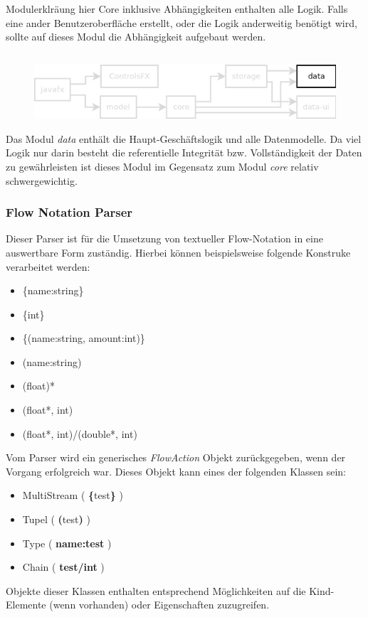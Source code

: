 Modulerklräung hier
Core inklusive Abhängigkeiten enthalten alle Logik. Falls eine ander Benutzeroberfläche erstellt,
oder die Logik anderweitig benötigt wird, sollte auf dieses Modul die Abhängigkeit aufgebaut werden.




\subsection{\textModData}
\label{\textModData}
\begin{figure}[h!]
	\centering
	\includegraphics[width=.8\textwidth]{module_dependencies_data.png}
\end{figure}

Das Modul \textit{data} enthält die Haupt-Geschäftslogik und alle Datenmodelle. Da viel Logik nur darin besteht
die referentielle Integrität bzw. Vollständigkeit der Daten zu gewährleisten ist dieses Modul im Gegensatz zum
Modul \textit{core} relativ schwergewichtig.

\subsubsection{Flow Notation Parser}
Dieser Parser ist für die Umsetzung von textueller Flow-Notation in eine auswertbare Form zuständig. Hierbei können
beispielsweise folgende Konstruke verarbeitet werden:

\begin{itemize}
	\item \{name:string\}
	\item \{int\}
	\item \{(name:string, amount:int)\}
	\item (name:string)
	\item (float)*
	\item (float*, int)
	\item (float*, int)/(double*, int)
\end{itemize}
Vom Parser wird ein generisches \textit{FlowAction} Objekt zurückgegeben, wenn der Vorgang erfolgreich war. Dieses
Objekt kann eines der folgenden Klassen sein:

\begin{itemize}
	\item MultiStream ( \textbf{\{}test\textbf{\}} )
	\item Tupel ( \textbf{(}test\textbf{)} )
	\item Type ( \textbf{name:test} )
	\item Chain ( \textbf{test/int} )
\end{itemize}
Objekte dieser Klassen enthalten entsprechend Möglichkeiten auf die Kind-Elemente (wenn vorhanden) oder
Eigenschaften zuzugreifen.
